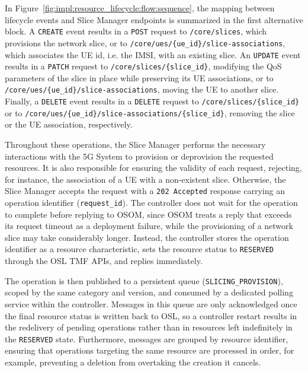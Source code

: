 In Figure~\ref{fig:impl:resource_lifecycle:flow:sequence}, the mapping between lifecycle events and Slice Manager endpoints is summarized in the first alternative block. A \texttt{CREATE} event results in a \texttt{POST} request to \texttt{/core/\allowbreak slices}, which provisions the network slice, or to \texttt{/core/\allowbreak ues/\allowbreak \{ue\_\allowbreak id\}/\allowbreak slice\allowbreak -associations}, which associates the \acs{UE} id, i.e. the \acs{IMSI}, with an existing slice. An \texttt{UPDATE} event results in a \texttt{PATCH} request to \texttt{/core/\allowbreak slices/\allowbreak \{slice\_\allowbreak id\}}, modifying the \acs{QoS} parameters of the slice in place while preserving its \acs{UE} associations, or to \texttt{/core/\allowbreak ues/\allowbreak \{ue\_\allowbreak id\}/\allowbreak slice\allowbreak -associations}, moving the \acs{UE} to another slice. Finally, a \texttt{DELETE} event results in a \texttt{DELETE} request to \texttt{/core/\allowbreak slices/\allowbreak \{slice\_\allowbreak id\}} or to \texttt{/core/\allowbreak ues/\allowbreak \{ue\_\allowbreak id\}/\allowbreak slice\allowbreak -associations/\allowbreak \{slice\_\allowbreak id\}}, removing the slice or the \acs{UE} association, respectively.

Throughout these operations, the Slice Manager performs the necessary interactions with the \acs{5G} System to provision or deprovision the requested resources. It is also responsible for ensuring the validity of each request, rejecting, for instance, the association of a \acs{UE} with a non-existent slice. Otherwise, the Slice Manager accepts the request with a \texttt{202 Accepted} response carrying an operation identifier (\texttt{request\_id}). The controller does not wait for the operation to complete before replying to OSOM, since OSOM treats a reply that exceeds its request timeout as a deployment failure, while the provisioning of a network slice may take considerably longer. Instead, the controller stores the operation identifier as a resource characteristic, sets the resource status to \texttt{RESERVED} through the \acs{OSL} \acs{TMF} \acsp{API}, and replies immediately.

The operation is then published to a persistent queue (\texttt{SLICING\_\allowbreak PROVISION}), scoped by the same category and version, and consumed by a dedicated polling service within the controller. Messages in this queue are only acknowledged once the final resource status is written back to \acs{OSL}, so a controller restart results in the redelivery of pending operations rather than in resources left indefinitely in the \texttt{RESERVED} state. Furthermore, messages are grouped by resource identifier, ensuring that operations targeting the same resource are processed in order, for example, preventing a deletion from overtaking the creation it cancels.


